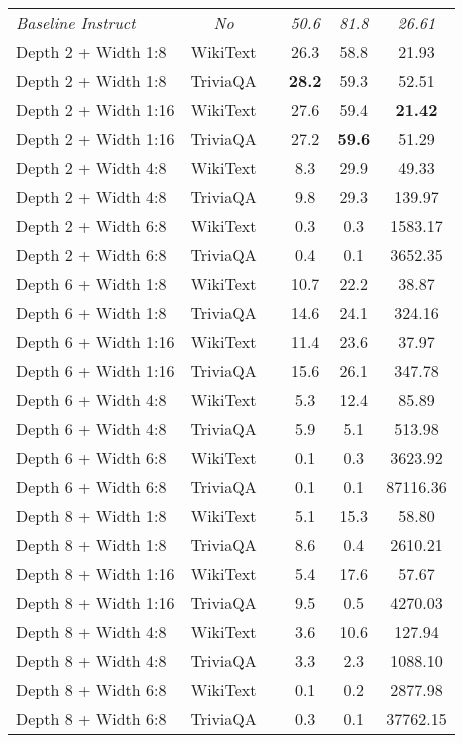 \begin{longtable}{lclccc}
\hline
\endlastfoot
\textit{Baseline Instruct} & \textit{No} & & \textit{50.6} & \textit{81.8} & \textit{26.61}\\
Depth 2 + Width 1:8 & WikiText & & 26.3 & 58.8 & 21.93 \\
Depth 2 + Width 1:8 & TriviaQA & & \textbf{28.2} & 59.3 & 52.51 \\
Depth 2 + Width 1:16 & WikiText & & 27.6 & 59.4 & \textbf{21.42} \\
Depth 2 + Width 1:16 & TriviaQA & & 27.2 & \textbf{59.6} & 51.29 \\
Depth 2 + Width 4:8 & WikiText & & 8.3 & 29.9 & 49.33 \\
Depth 2 + Width 4:8 & TriviaQA & & 9.8 & 29.3 & 139.97 \\
Depth 2 + Width 6:8 & WikiText & & 0.3 & 0.3 & 1583.17 \\
Depth 2 + Width 6:8 & TriviaQA & & 0.4 & 0.1 & 3652.35 \\
Depth 6 + Width 1:8 & WikiText & & 10.7 & 22.2 & 38.87 \\
Depth 6 + Width 1:8 & TriviaQA & & 14.6 & 24.1 & 324.16 \\
Depth 6 + Width 1:16 & WikiText & & 11.4 & 23.6 & 37.97 \\
Depth 6 + Width 1:16 & TriviaQA & & 15.6 & 26.1 & 347.78 \\
Depth 6 + Width 4:8 & WikiText & & 5.3 & 12.4 & 85.89 \\
Depth 6 + Width 4:8 & TriviaQA & & 5.9 & 5.1 & 513.98 \\
Depth 6 + Width 6:8 & WikiText & & 0.1 & 0.3 & 3623.92 \\
Depth 6 + Width 6:8 & TriviaQA & & 0.1 & 0.1 & 87116.36 \\
Depth 8 + Width 1:8 & WikiText & & 5.1 & 15.3 & 58.80 \\
Depth 8 + Width 1:8 & TriviaQA & & 8.6 & 0.4 & 2610.21 \\
Depth 8 + Width 1:16 & WikiText & & 5.4 & 17.6 & 57.67 \\
Depth 8 + Width 1:16 & TriviaQA & & 9.5 & 0.5 & 4270.03 \\
Depth 8 + Width 4:8 & WikiText & & 3.6 & 10.6 & 127.94 \\
Depth 8 + Width 4:8 & TriviaQA & & 3.3 & 2.3 & 1088.10 \\
Depth 8 + Width 6:8 & WikiText & & 0.1 & 0.2 & 2877.98 \\
Depth 8 + Width 6:8 & TriviaQA & & 0.3 & 0.1 & 37762.15 \\
\end{longtable}
\normalsize

